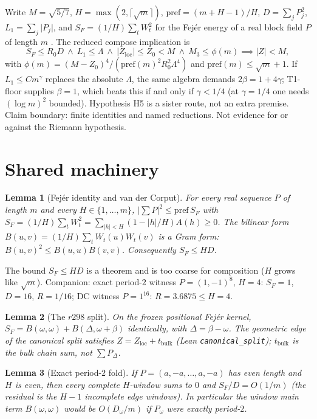 \documentclass[11pt]{article}
\newtheorem{lemma}{Lemma}
\theoremstyle{remark}
\newcommand{\pref}{\mathrm{pref}}
\newcommand{\loc}{\mathrm{loc}}
\begin{document}
Write $M=\sqrt{5/7}$, $H=\max(2,\lceil\sqrt{m}\rceil)$,
$\pref=(m+H-1)/H$, $D=\sum_j P_j^2$, $L_1=\sum_j\lvert P_j\rvert$,
and $S_F=(1/H)\sum_t W_t^2$ for the Fej\'er energy of a real
block field $P$ of length $m$ \cite{r378}.
The reduced compose implication is
\[
  S_F\le R_0 D
  \ \wedge\
  L_1\le\Lambda
  \ \wedge\
  \lvert Z_{\loc}\rvert\le Z_0<M
  \ \wedge\
  M_3\le\phi(m)
  \implies
  \lvert Z\rvert<M,
\]
with
$\phi(m)=(M-Z_0)^4/(\pref(m)^2 R_0^2\Lambda^4)$
and $\pref(m)\le\sqrt{m}+1$.
If $L_1\le C m^\gamma$ replaces the absolute $\Lambda$, the
same algebra demands $2\beta=1+4\gamma$; T1-floor supplies
$\beta=1$, which beats this if and only if $\gamma<1/4$
(at $\gamma=1/4$ one needs $(\log m)^2$ bounded).
Hypothesis H5 is a sister route, not an extra premise.
Claim boundary: finite identities and named reductions.
Not evidence for or against the Riemann hypothesis.

\section{Shared machinery}\label{sec:shared}

\begin{lemma}[Fej\'er identity and van der Corput]\label{lem:fejer}
For every real sequence $P$ of length $m$ and every
$H\in\{1,\ldots,m\}$,
$\lvert\sum P\rvert^2\le\pref\,S_F$ with
$S_F=(1/H)\sum_t W_t^2=\sum_{\lvert h\rvert<H}(1-\lvert h\rvert/H)A(h)\ge 0$.
The bilinear form $B(u,v)=(1/H)\sum_t W_t(u)W_t(v)$ is a Gram form:
$B(u,v)^2\le B(u,u)B(v,v)$.  Consequently $S_F\le H D$.
\end{lemma}

\noindent
The bound $S_F\le H D$ is a theorem and is too coarse for
composition ($H$ grows like $\sqrt{m}$).  Companion: exact
period-$2$ witness $P=(1,-1)^{8}$, $H=4$: $S_F=1$, $D=16$,
$R=1/16$; DC witness $P=1^{16}$: $R=3.6875\le H=4$.

\begin{lemma}[The $r298$ split]\label{lem:split}
On the frozen positional Fej\'er kernel,
$S_F=B(\omega,\omega)+B(\Delta,\omega+\beta)$ identically,
with $\Delta=\beta-\omega$.
The geometric edge of the canonical split satisfies
$Z=Z_{\loc}+t_{\mathrm{bulk}}$ (Lean \texttt{canonical\_split});
$t_{\mathrm{bulk}}$ is the bulk chain sum, not $\sum P_\Delta$.
\end{lemma}

\begin{lemma}[Exact period-$2$ fold]\label{lem:fold}
If $P=(a,-a,\ldots,a,-a)$ has even length and $H$ is even, then
every complete $H$-window sums to $0$ and $S_F/D=O(1/m)$
(the residual is the $H-1$ incomplete edge windows).
In particular the window main term $B(\omega,\omega)$ would be
$O(D_\omega/m)$ if $P_\omega$ were exactly period-$2$.
\end{lemma}
\end{document}
